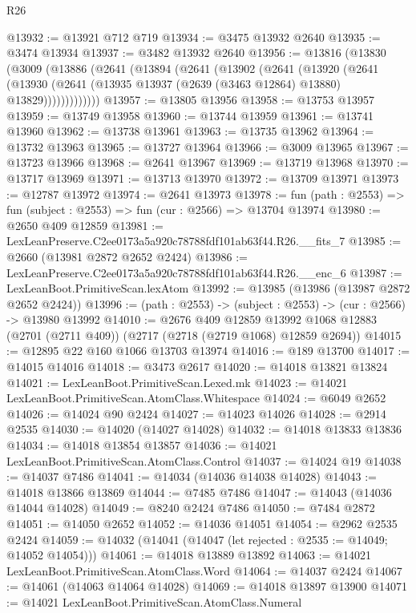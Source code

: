 \begin{lexlean}{R26}
\begin{coremodule}
@13932 := @13921 @712 @719
@13934 := @3475 @13932 @2640
@13935 := @3474 @13934
@13937 := @3482 @13932 @2640
@13956 := @13816
    (@13830
      (@3009
        (@13886
          (@2641
            (@13894
              (@2641
                (@13902
                  (@2641
                    (@13920
                      (@2641
                        (@13930
                          (@2641 (@13935 @13937 (@2639 (@3463 @12864) @13880) @13829)))))))))))))
@13957 := @13805 @13956
@13958 := @13753 @13957
@13959 := @13749 @13958
@13960 := @13744 @13959
@13961 := @13741 @13960
@13962 := @13738 @13961
@13963 := @13735 @13962
@13964 := @13732 @13963
@13965 := @13727 @13964
@13966 := @3009 @13965
@13967 := @13723 @13966
@13968 := @2641 @13967
@13969 := @13719 @13968
@13970 := @13717 @13969
@13971 := @13713 @13970
@13972 := @13709 @13971
@13973 := @12787 @13972
@13974 := @2641 @13973
@13978 := fun (path : @2553) => fun (subject : @2553) => fun (cur : @2566) => @13704 @13974
@13980 := @2650 @409 @12859
@13981 := LexLeanPreserve.C2ee0173a5a920c78788fdf101ab63f44.R26.__fits_7
@13985 := @2660 (@13981 @2872 @2652 @2424)
@13986 := LexLeanPreserve.C2ee0173a5a920c78788fdf101ab63f44.R26.__enc_6
@13987 := LexLeanBoot.PrimitiveScan.lexAtom
@13992 := @13985 (@13986 (@13987 @2872 @2652 @2424))
@13996 := (path : @2553) -> (subject : @2553) -> (cur : @2566) -> @13980 @13992
@14010 := @2676
    @409
    @12859
    @13992
    @1068
    @12883
    (@2701 (@2711 @409))
    (@2717 (@2718 (@2719 @1068) @12859 @2694))
@14015 := @12895 @22 @160 @1066 @13703 @13974
@14016 := @189 @13700
@14017 := @14015 @14016
@14018 := @3473 @2617
@14020 := @14018 @13821 @13824
@14021 := LexLeanBoot.PrimitiveScan.Lexed.mk
@14023 := @14021 LexLeanBoot.PrimitiveScan.AtomClass.Whitespace
@14024 := @6049 @2652
@14026 := @14024 @90 @2424
@14027 := @14023 @14026
@14028 := @2914 @2535
@14030 := @14020 (@14027 @14028)
@14032 := @14018 @13833 @13836
@14034 := @14018 @13854 @13857
@14036 := @14021 LexLeanBoot.PrimitiveScan.AtomClass.Control
@14037 := @14024 @19
@14038 := @14037 @7486
@14041 := @14034 (@14036 @14038 @14028)
@14043 := @14018 @13866 @13869
@14044 := @7485 @7486
@14047 := @14043 (@14036 @14044 @14028)
@14049 := @8240 @2424 @7486
@14050 := @7484 @2872
@14051 := @14050 @2652
@14052 := @14036 @14051
@14054 := @2962 @2535 @2424
@14059 := @14032 (@14041 (@14047 (let rejected : @2535 := @14049; @14052 @14054)))
@14061 := @14018 @13889 @13892
@14063 := @14021 LexLeanBoot.PrimitiveScan.AtomClass.Word
@14064 := @14037 @2424
@14067 := @14061 (@14063 @14064 @14028)
@14069 := @14018 @13897 @13900
@14071 := @14021 LexLeanBoot.PrimitiveScan.AtomClass.Numeral

\end{coremodule}
\end{lexlean}
